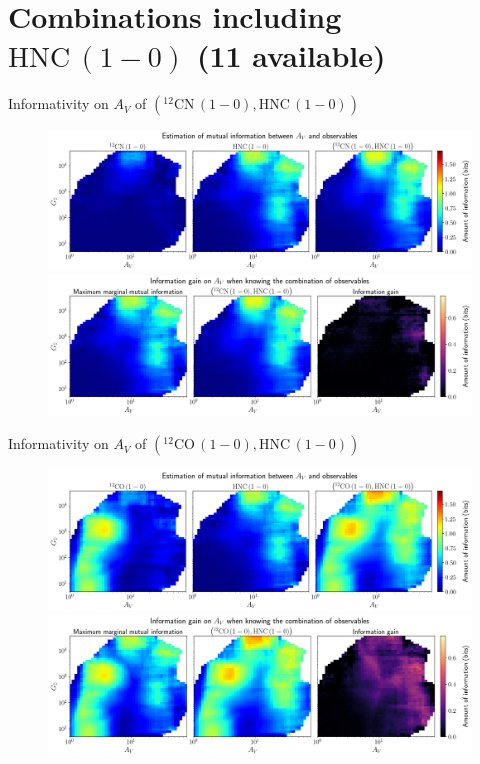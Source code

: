 \documentclass{beamer}
\begin{document}
\section{Combinations including $\mathrm{HNC\,(1-0)}$ (11 available)}

\begin{frame}{Informativity on $A_V$ of $\left(\mathrm{^{12}CN\,(1-0)},\mathrm{HNC\,(1-0)}\right)$}
    \begin{figure}
        \centering
        \includegraphics[width=0.95\linewidth]{../mi/av__12cn10_hnc10_mi.png}
        \vfill
        \includegraphics[width=0.95\linewidth]{../mi/av__12cn10_hnc10_mi_gain.png}
    \end{figure}
\end{frame}

\begin{frame}{Informativity on $A_V$ of $\left(\mathrm{^{12}CO\,(1-0)},\mathrm{HNC\,(1-0)}\right)$}
    \begin{figure}
        \centering
        \includegraphics[width=0.95\linewidth]{../mi/av__12co10_hnc10_mi.png}
        \vfill
        \includegraphics[width=0.95\linewidth]{../mi/av__12co10_hnc10_mi_gain.png}
    \end{figure}
\end{frame}
\end{document}

